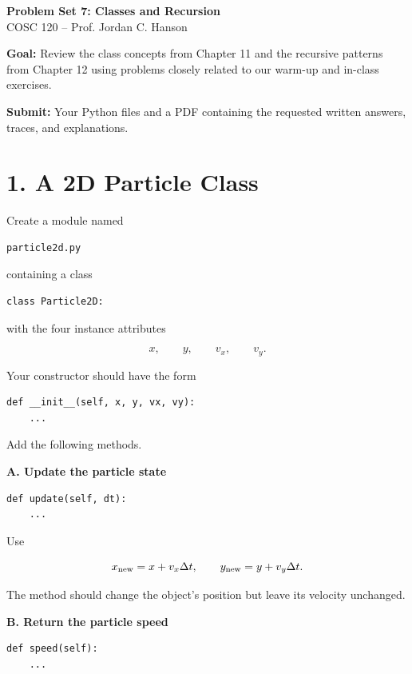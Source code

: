 \documentclass[11pt]{article}
\begin{document}
\twocolumn

\begin{center}
{\Large \textbf{Problem Set 7: Classes and Recursion}}\\[-1mm]
COSC 120 -- Prof. Jordan C. Hanson
\end{center}

\textbf{Goal:} Review the class concepts from Chapter 11 and the
recursive patterns from Chapter 12 using problems closely related to
our warm-up and in-class exercises.

\textbf{Submit:} Your Python files and a PDF containing the requested
written answers, traces, and explanations.

\section*{1. A 2D Particle Class}

Create a module named

\begin{lstlisting}
particle2d.py
\end{lstlisting}

containing a class

\begin{lstlisting}
class Particle2D:
\end{lstlisting}

with the four instance attributes

\[
x,\qquad y,\qquad v_x,\qquad v_y.
\]

Your constructor should have the form

\begin{lstlisting}
def __init__(self, x, y, vx, vy):
    ...
\end{lstlisting}

Add the following methods.

\textbf{A. Update the particle state}

\begin{lstlisting}
def update(self, dt):
    ...
\end{lstlisting}

Use

\[
x_{\rm new}=x+v_x\Delta t,
\qquad
y_{\rm new}=y+v_y\Delta t.
\]

The method should change the object's position but leave its velocity
unchanged.

\textbf{B. Return the particle speed}

\begin{lstlisting}
def speed(self):
    ...
\end{lstlisting}
\end{document}
